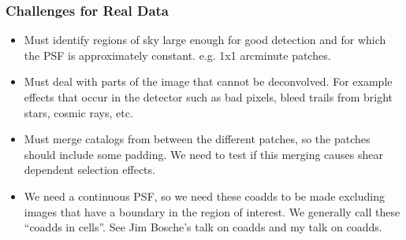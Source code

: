\documentclass{beamer}
\begin{document}
\frame
{
    \frametitle{Challenges for Real Data}

 
    \begin{itemize}


        \item Must identify regions of sky large enough for
            good detection and for which the PSF is approximately constant.
            e.g. 1x1 arcminute patches.

        \item Must deal with parts of the image that cannot be deconvolved. For
            example effects that occur in the detector such as bad pixels, bleed trails
            from bright stars, cosmic rays, etc.

        \item Must merge catalogs from between the different patches, so
            the patches should include some padding.  We need to test if this
            merging causes shear dependent selection effects.

        \item We need a continuous PSF, so we need these coadds to be made
            excluding images that have a boundary in the region of interest.
            We generally call these ``coadds in cells''.
            See Jim  Bosche's talk on coadds and my talk on coadds.

    \end{itemize}

}



 


\end{document}
